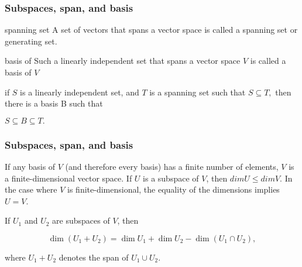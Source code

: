 \documentclass{beamer}
\begin{document}
    \begin{frame}
        \frametitle{Subspaces, span, and basis}
        \begin{block}{spanning set}
            A set of vectors that spans a vector space is called a spanning set or generating set.\cite{3}

        \end{block}
        \pause

        \begin{block}{basis of}
            Such a linearly independent set that spans a vector space $V$ is called a basis of $V$

        \end{block}
        \pause

        if $S$ is a linearly independent set,
        and $T$ is a spanning set such that $S\subseteq T,$ then there is a basis B such that

        \pause

        \begin{alertblock}{}
            $S\subseteq B\subseteq T.$

        \end{alertblock}

    \end{frame}

    \begin{frame}
        \frametitle{Subspaces, span, and basis}



        \begin{block}{}

            If any basis of $V$ (and therefore every basis) has a finite number of elements, $V$ is a finite-dimensional vector
            space. If $U$ is a subspace of $V$, then $dim U \leq dim V$. In the case where $V$ is finite-dimensional, the equality of
            the dimensions implies $U=V$.

        \end{block}
        \pause


        \begin{alertblock}{}
            If $U_1$ and $U_2$ are subspaces of $V$, then

            $$\dim(U_{1}+U_{2})=\dim U_{1}+\dim U_{2}-\dim(U_{1}\cap U_{2}),$$

            where $U_{1}+U_{2}$ denotes the span of $ U_{1}\cup U_{2}.$\cite{4}

        \end{alertblock}

    \end{frame}
\end{document}
